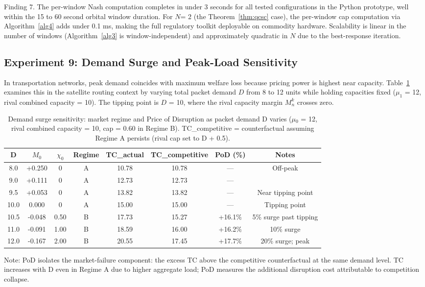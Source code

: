 \documentclass[review,3p,authoryear]{elsarticle}
\begin{document}
Finding 7. The per-window Nash computation completes in under 3 seconds for all tested configurations in the Python prototype, well within the 15 to 60 second orbital window duration. For $N$= 2 (the Theorem~\ref{thm:qcsc} case), the per-window cap computation via Algorithm~\ref{alg4} adds under 0.1 ms, making the full regulatory toolkit deployable on commodity hardware. Scalability is linear in the number of windows (Algorithm~\ref{alg3} is window-independent) and approximately quadratic in $N$ due to the best-response iteration.

\subsection{Experiment 9: Demand Surge and Peak-Load Sensitivity}
\label{sec6.9}

In transportation networks, peak demand coincides with maximum welfare loss because pricing power is highest near capacity. Table~\ref{tab:8} examines this in the satellite routing context by varying total packet demand $D$ from 8 to 12 units while holding capacities fixed (${\mu}_{1}$ = 12, rival combined capacity = 10). The tipping point is $D$ = 10, where the rival capacity margin $M_{n}^{k}$ crosses zero.

\begin{table}[!ht]
\centering
\caption{Demand surge sensitivity: market regime and Price of Disruption as packet demand D varies (\ensuremath{\mu}\ensuremath{_{0}} = 12, rival combined capacity = 10, cap = 0.60 in Regime B). TC\_competitive = counterfactual assuming Regime A persists (rival cap set to D + 0.5).}
\label{tab:8}
\begin{tabular}{@{}cccccccc@{}}
\toprule
\textbf{D} & \textbf{$M_0$} & \textbf{$\chi_0$} & \textbf{Regime} & \textbf{TC\_actual} & \textbf{TC\_competitive} & \textbf{PoD (\%)} & \textbf{Notes} \\ \midrule
8.0 & +0.250 & 0 & A & 10.78 & 10.78 & — & Off-peak \\
9.0 & +0.111 & 0 & A & 12.73 & 12.73 & — &  \\
9.5 & +0.053 & 0 & A & 13.82 & 13.82 & — & Near tipping point \\
10.0 & 0.000 & 0 & A & 15.00 & 15.00 & — & Tipping point \\
10.5 & -0.048 & 0.50 & B & 17.73 & 15.27 & +16.1\% & 5\% surge past tipping \\
11.0 & -0.091 & 1.00 & B & 18.59 & 16.00 & +16.2\% & 10\% surge \\
12.0 & -0.167 & 2.00 & B & 20.55 & 17.45 & +17.7\% & 20\% surge; peak \\ \bottomrule
\end{tabular}
\end{table}
Note: PoD isolates the market-failure component: the excess TC above the competitive counterfactual at the same demand level. TC increases with D even in Regime A due to higher aggregate load; PoD measures the additional disruption cost attributable to competition collapse.
\end{document}

